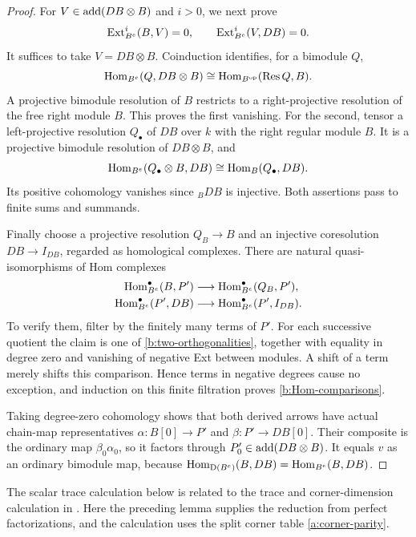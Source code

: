 \begin{proof}
For \(V\in\operatorname{add}(DB\otimes B)\) and \(i>0\), we next prove
\begin{equation}\label{b:two-orthogonalities}
 \operatorname{Ext}_{B^e}^i(B,V)=0,\qquad
 \operatorname{Ext}_{B^e}^i(V,DB)=0.
\end{equation}
It suffices to take \(V=DB\otimes B\).
Coinduction identifies, for a bimodule \(Q\),
\[
 \operatorname{Hom}_{B^e}(Q,DB\otimes B)
 \cong\operatorname{Hom}_{B^{\mathrm{op}}}(\operatorname{Res} Q,B).
\]
A projective bimodule resolution of \(B\) restricts to a
right-projective resolution of the free right module \(B\).
This proves the first vanishing.
For the second, tensor a left-projective resolution \(Q_\bullet\)
of \(DB\) over \(k\) with the right regular module \(B\).
It is a projective bimodule resolution of \(DB\otimes B\), and
\[
 \operatorname{Hom}_{B^e}(Q_\bullet\otimes B,DB)
 \cong\operatorname{Hom}_B(Q_\bullet,DB).
\]
Its positive cohomology vanishes since \({}_BDB\) is injective.
Both assertions pass to finite sums and summands.

Finally choose a projective resolution \(Q_B\to B\) and an
injective coresolution \(DB\to I_{DB}\), regarded as homological
complexes.  There are natural quasi-isomorphisms of Hom complexes
\begin{equation}\label{b:Hom-comparisons}
 \begin{split}
 \operatorname{Hom}^\bullet_{B^e}(B,P')&\longrightarrow
       \operatorname{Hom}^\bullet_{B^e}(Q_B,P'),\\
 \operatorname{Hom}^\bullet_{B^e}(P',DB)&\longrightarrow
       \operatorname{Hom}^\bullet_{B^e}(P',I_{DB}).
 \end{split}
\end{equation}
To verify them, filter by the finitely many terms of \(P'\).
For each successive quotient the claim is one of
\eqref{b:two-orthogonalities}, together with equality in degree
zero and vanishing of negative Ext between modules.  A shift of
a term merely shifts this comparison.  Hence terms in negative
degrees cause no exception, and induction on this finite
filtration proves \eqref{b:Hom-comparisons}.

Taking degree-zero cohomology shows that both derived arrows
have actual chain-map representatives
\(\alpha:B[0]\to P'\) and \(\beta:P'\to DB[0]\).
Their composite is the ordinary map \(\beta_0\alpha_0\), so it
factors through \(P'_0\in\operatorname{add}(DB\otimes B)\).
It equals \(v\) as an ordinary bimodule map, because
\(\operatorname{Hom}_{\mathrm D(B^e)}(B,DB)=\operatorname{Hom}_{B^e}(B,DB)\).
\end{proof}

The scalar trace calculation below is related to the trace and
corner-dimension calculation in
\cite[Example~3.2(1) and proof of Theorem~3.8]{LiuZhouZimmermann2012}.
Here the preceding lemma supplies the reduction from perfect
factorizations, and the calculation uses the split corner table
\eqref{a:corner-parity}.

